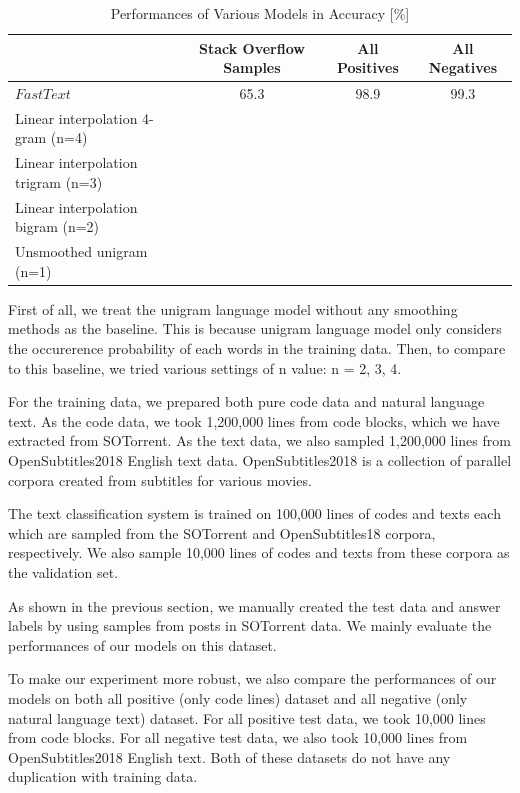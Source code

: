 \documentclass[conference]{IEEEtran}
\begin{document}
\begin{table}[tbh]
\begin{center}
\begin{tabular}{|l|c|c|c|} \hline
 & Stack Overflow Samples & All Positives & All Negatives\\
\hline\hline
$FastText$ &  65.3 & 98.9 & 99.3\\\hline
Linear interpolation 4-gram (n=4) &  &  & \\\hline
Linear interpolation trigram (n=3) &  &  & \\\hline
Linear interpolation bigram (n=2) &  &  & \\\hline
Unsmoothed unigram (n=1) &  &  & \\\hline
\end{tabular}
\caption{Performances of Various Models in Accuracy [\%]}
\end{center}
\end{table} 

First of all, we treat the unigram language model without any smoothing methods as the baseline. This is because unigram language model only considers the occurerence probability of each words in the training data. Then, to compare to this baseline, we tried various settings of n value: n = 2, 3, 4.

For the training data, we prepared both pure code data and natural language text. As the code data, we took 1,200,000 lines from code blocks, which we have extracted from SOTorrent. As the text data, we also sampled 1,200,000 lines from OpenSubtitles2018 English text data\cite{b3}. OpenSubtitles2018 is a collection of parallel corpora created from subtitles for various movies.

The text classification system is trained on 100,000 lines of codes and texts each which are sampled from the SOTorrent and OpenSubtitles18 corpora, respectively. We also sample 10,000 lines of codes and texts from these corpora as the validation set.

As shown in the previous section, we manually created the test data and answer labels by using samples from  posts in SOTorrent data. We mainly evaluate the performances of our models on this dataset.

To make our experiment more robust, we also compare the performances of our models on both all positive (only code lines) dataset and all negative (only natural language text) dataset. For all positive test data, we took 10,000 lines from code blocks. For all negative test data, we also took 10,000 lines from OpenSubtitles2018 English text. Both of these datasets do not have any duplication with training data.
\end{document}
